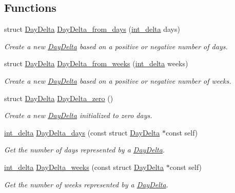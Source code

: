 \subsection*{Functions}
\begin{DoxyCompactItemize}
\item 
struct \hyperlink{structDayDelta}{Day\-Delta} \hyperlink{day-delta_8h_a50a5b111e380372e918e4d67f4b1814d}{Day\-Delta\-\_\-from\-\_\-days} (\hyperlink{types_8h_a8a67cf99971c5cfeeaa2380ba84a4c92}{int\-\_\-delta} days)
\begin{DoxyCompactList}\small\item\em Create a new \hyperlink{structDayDelta}{Day\-Delta} based on a positive or negative number of days. \end{DoxyCompactList}\item 
struct \hyperlink{structDayDelta}{Day\-Delta} \hyperlink{day-delta_8h_ac44c70541cf4f255f25384194341ff07}{Day\-Delta\-\_\-from\-\_\-weeks} (\hyperlink{types_8h_a8a67cf99971c5cfeeaa2380ba84a4c92}{int\-\_\-delta} weeks)
\begin{DoxyCompactList}\small\item\em Create a new \hyperlink{structDayDelta}{Day\-Delta} based on a positive or negative number of weeks. \end{DoxyCompactList}\item 
struct \hyperlink{structDayDelta}{Day\-Delta} \hyperlink{day-delta_8h_ab87d828518fe1bdc7e7662be3e5e6289}{Day\-Delta\-\_\-zero} ()
\begin{DoxyCompactList}\small\item\em Create a new \hyperlink{structDayDelta}{Day\-Delta} initialized to zero days. \end{DoxyCompactList}\item 
\hyperlink{types_8h_a8a67cf99971c5cfeeaa2380ba84a4c92}{int\-\_\-delta} \hyperlink{day-delta_8h_aa57ce59c7908dcad9d8dcc18c84909a6}{Day\-Delta\-\_\-days} (const struct \hyperlink{structDayDelta}{Day\-Delta} $\ast$const self)
\begin{DoxyCompactList}\small\item\em Get the number of days represented by a \hyperlink{structDayDelta}{Day\-Delta}. \end{DoxyCompactList}\item 
\hyperlink{types_8h_a8a67cf99971c5cfeeaa2380ba84a4c92}{int\-\_\-delta} \hyperlink{day-delta_8h_ae0cf870931630123311dc3f532916813}{Day\-Delta\-\_\-weeks} (const struct \hyperlink{structDayDelta}{Day\-Delta} $\ast$const self)
\begin{DoxyCompactList}\small\item\em Get the number of weeks represented by a \hyperlink{structDayDelta}{Day\-Delta}. \end{DoxyCompactList}\item 

\end{DoxyCompactItemize}
